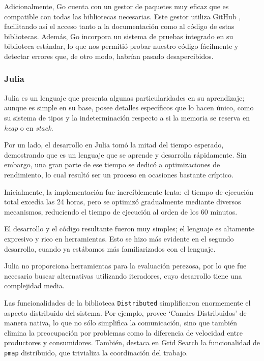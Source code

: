 \documentclass[11pt]{article}
\let\Oldsubsubsection\subsubsection
\renewcommand{\subsubsection}{\FloatBarrier\Oldsubsubsection}
\newcommand{\english}[1]{\textit{#1}}
\begin{document}
Adicionalmente, Go cuenta con un gestor de paquetes muy eficaz que es compatible con todas las bibliotecas necesarias. Este gestor utiliza GitHub \cite{com:github}, facilitando así el acceso tanto a la documentación como al código de estas bibliotecas. Además, Go incorpora un sistema de pruebas integrado en su biblioteca estándar, lo que nos permitió probar nuestro código fácilmente y detectar errores que, de otro modo, habrían pasado desapercibidos.

\subsubsection{Julia}

Julia es un lenguaje que presenta algunas particularidades en su aprendizaje; aunque es simple en su base, posee detalles específicos que lo hacen único, como su sistema de tipos y la indeterminación respecto a si la memoria se reserva en \english{heap} o en \english{stack}.

Por un lado, el desarrollo en Julia tomó la mitad del tiempo esperado, demostrando que es un lenguaje que se aprende y desarrolla rápidamente. Sin embargo, una gran parte de ese tiempo se dedicó a optimizaciones de rendimiento, lo cual resultó ser un proceso en ocasiones bastante críptico.

Inicialmente, la implementación fue increíblemente lenta: el tiempo de ejecución total excedía las 24 horas, pero se optimizó gradualmente mediante diversos mecanismos, reduciendo el tiempo de ejecución al orden de los 60 minutos.

El desarrollo y el código resultante fueron muy simples; el lenguaje es altamente expresivo y rico en herramientas. Esto se hizo más evidente en el segundo desarrollo, cuando ya estábamos más familiarizados con el lenguaje.

Julia no proporciona herramientas para la evaluación perezosa, por lo que fue necesario buscar alternativas utilizando iteradores, cuyo desarrollo tiene una complejidad media.

Las funcionalidades de la biblioteca \lstinline{Distributed} simplificaron enormemente el aspecto distribuido del sistema. Por ejemplo, provee ‘Canales Distribuidos’ de manera nativa, lo que no sólo simplifica la comunicación, sino que también elimina la preocupación por problemas como la diferencia de velocidad entre productores y consumidores. También, destaca en Grid Search la funcionalidad de \lstinline{pmap} distribuido, que trivializa la coordinación del trabajo.
\end{document}
